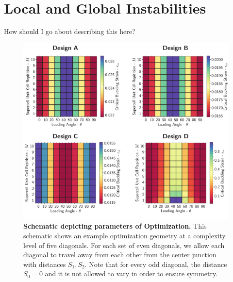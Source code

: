 \documentclass[10pt,twoside]{fernandes_supp}
\newcommand{\mf}[1]{\colorbox{blue!10}{\color{color3}#1}}
\begin{document}
\section{Local and Global Instabilities}
\mf{How should I go about describing this here?}
\begin{figure}
	\centering
	\includegraphics[width=0.7\linewidth]{SFig12.pdf}
	\caption{{\bf Schematic depicting parameters of Optimization.} This schematic shows an example optimization geometry  at a complexity level of five diagonals. For each set of even diagonals, we allow each diagonal to travel away from each other from the center junction with distances $S_1,S_2$. Note that for every odd diagonal, the distance $S_0=0$ and it is not allowed to vary in order to ensure symmetry.}
	\label{DomainSizeSchematic}
\end{figure}



% 
\end{document}
